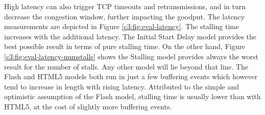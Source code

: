 High latency can also trigger TCP timeouts and retransmissions, and in turn decrease the congestion window, further impacting the goodput. The latency measurements are depicted in Figure \ref{c3:fig:eval-latency}. The stalling time increases with the additional latency. The Initial Start Delay model provides the best possible result in terms of pure stalling time. On the other hand, Figure \ref{c3:fig:eval-latency-numstalls} shows the Stalling model provides always the worst result for the number of stalls. Any other model will lie beyond that line. The Flash and HTML5 models both run in just a few buffering events which however tend to increase in length with rising latency. Attributed to the simple and optimistic assumption of the Flash model, stalling time is usually lower than with HTML5, at the cost of slightly more buffering events.
 

